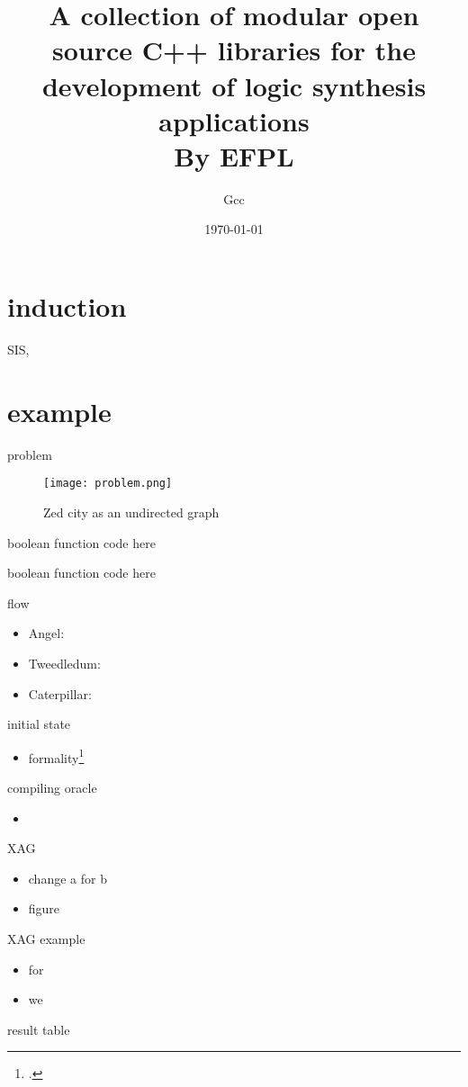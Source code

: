 \documentclass[aspectratio=1610]{beamer}
\title{A collection of modular open source C++ libraries for the development of logic synthesis applications\\ By EFPL}
\author{Gcc}
\date\today
\begin{document}
\begin{frame}[plain]
  \titlepage
\end{frame}
\section{induction}
\begin{frame}
  SIS, 
\end{frame}

\section{example}
\begin{frame}{problem}
  \begin{figure}[htbq]
    \centering
    \texttt{[image: problem.png]}
    \caption{Zed city as an undirected graph} 
    \label{dataset}
  \end{figure}
\end{frame}
\begin{frame}{boolean function}
  code here
\end{frame}
\begin{frame}{boolean function}
  code here
\end{frame}
\begin{frame}{flow}
  \begin{itemize}
    \item Angel:
    \item Tweedledum:
    \item Caterpillar:
  \end{itemize}
\end{frame}
\begin{frame}{initial state}
  \begin{itemize}
    \item formality\footcite{}
  \end{itemize}
\end{frame}
\begin{frame}{compiling oracle}
  \begin{itemize}
    \item 
  \end{itemize}
\end{frame}
\begin{frame}{XAG}
  \begin{itemize}
    \item change a for b
    \item figure
  \end{itemize}
\end{frame}
\begin{frame}{XAG example}
  \begin{itemize}
    \item for
    \item we 
  \end{itemize}
\end{frame}
\begin{frame}{result}
  table   
\end{frame}
\end{document}
